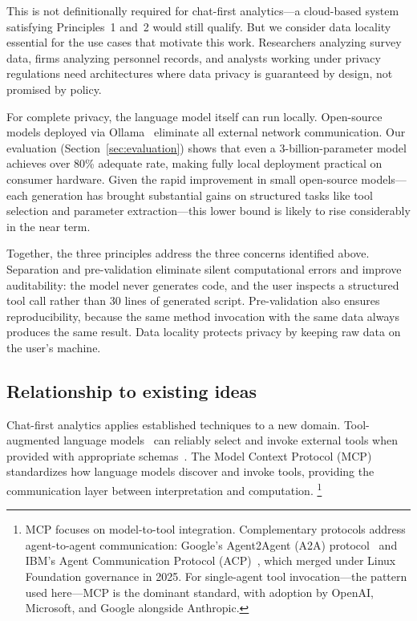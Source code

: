 This is not definitionally required for chat-first analytics---a
cloud-based system satisfying Principles~1 and~2 would still qualify.
But we consider data locality essential for the use cases that
motivate this work. Researchers analyzing survey data, firms analyzing
personnel records, and analysts working under privacy regulations need
architectures where data privacy is guaranteed by design, not
promised by policy.

For complete privacy, the language model itself can run locally.
Open-source models deployed via Ollama~\citep{Ollama} eliminate all
external network communication. Our evaluation
(Section~\ref{sec:evaluation}) shows that even a 3-billion-parameter
model achieves over 80\% adequate rate, making fully local
deployment practical on consumer hardware. Given the rapid
improvement in small open-source models---each generation has brought
substantial gains on structured tasks like tool selection and
parameter extraction---this lower bound is likely to rise
considerably in the near term.

Together, the three principles address the three concerns identified
above. Separation and pre-validation eliminate silent computational
errors and improve auditability: the model never generates code, and
the user inspects a structured tool call rather than 30 lines of
generated script. Pre-validation also ensures reproducibility, because
the same method invocation with the same data always produces the same
result. Data locality protects privacy by keeping raw data on the
user's machine.

\subsection{Relationship to existing ideas}

Chat-first analytics applies established techniques to a new domain.
Tool-augmented language models~\citep{Schick+etal:2023, Yao+etal:2023}
can reliably select and invoke external tools when provided with
appropriate schemas~\citep{Qu+etal:2025, Liu+etal:2025:ToolACE}. The
Model Context Protocol (MCP)~\citep{MCP:2024} standardizes how
language models discover and invoke tools, providing the communication
layer between interpretation and computation.%
\footnote{MCP focuses on model-to-tool integration. Complementary
protocols address agent-to-agent communication: Google's Agent2Agent
(A2A) protocol~\citep{A2A:2025} and IBM's Agent Communication
Protocol (ACP)~\citep{ACP:2025}, which merged under Linux Foundation
governance in 2025. For single-agent tool invocation---the pattern
used here---MCP is the dominant standard, with adoption by OpenAI,
Microsoft, and Google alongside Anthropic.}

